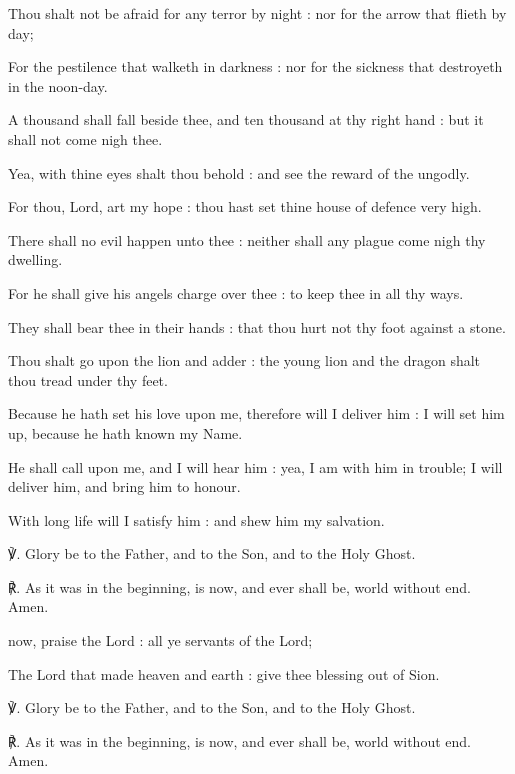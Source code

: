 Thou shalt not be afraid for any terror by night : nor for the arrow that flieth by day;\par
{}For the pestilence that walketh in darkness : nor for the sickness that destroyeth in the noon-day.\par
{}A thousand shall fall beside thee, and ten thousand at thy right hand : but it shall not come nigh thee.\par
{}Yea, with thine eyes shalt thou behold : and see the reward of the ungodly.\par
{}For thou, Lord, art my hope : thou hast set thine house of defence very high.\par
{}There shall no evil happen unto thee : neither shall any plague come nigh thy dwelling.\par
{}For he shall give his angels charge over thee : to keep thee in all thy ways.\par
{}They shall bear thee in their hands : that thou hurt not thy foot against a stone.\par
{}Thou shalt go upon the lion and adder : the young lion and the dragon shalt thou tread under thy feet.\par
{}Because he hath set his love upon me, therefore will I deliver him : I will set him up, because he hath known my Name.\par
{}He shall call upon me, and I will hear him : yea, I am with him in trouble; I will deliver him, and bring him to honour.\par
{}With long life will I satisfy him : and shew him my salvation.\par
℣. Glory be to the Father, and to the Son, and to the Holy Ghost.\par
℟. As it was in the beginning, is now, and ever shall be, world without end. Amen.
\par
{}
 now, praise the Lord : all ye servants of the Lord;\par
{}
The Lord that made heaven and earth : give thee blessing out of Sion.\par
℣. Glory be to the Father, and to the Son, and to the Holy Ghost.\par
℟. As it was in the beginning, is now, and ever shall be, world without end. Amen.
